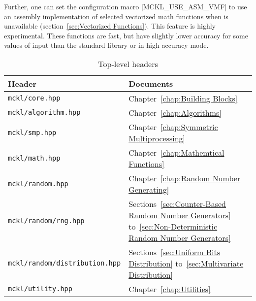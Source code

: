 Further, one can set the configuration macro |MCKL_USE_ASM_VMF| to use an
assembly implementation of selected vectorized math functions when \mkl \vml is
unavailable (section~\ref{sec:Vectorized Functions}). This feature is highly
experimental. These functions are fast, but have slightly lower accuracy for
some values of input than the standard library or \mkl \vml in high accuracy
mode.

\begin{table}[ht]
  \begin{tabularx}{\textwidth}{LL}
    \toprule
    Header & Documents \\
    \midrule
    \texttt{mckl/core.hpp}     & Chapter~\ref{chap:Building Blocks}          \\
    \texttt{mckl/algorithm.hpp}& Chapter~\ref{chap:Algorithms}               \\
    \texttt{mckl/smp.hpp}      & Chapter~\ref{chap:Symmetric Multiprocessing}\\
    \texttt{mckl/math.hpp}     & Chapter~\ref{chap:Mathemtical Functions}    \\
    \texttt{mckl/random.hpp}   & Chapter~\ref{chap:Random Number Generating} \\
    \texttt{mckl/random/rng.hpp}
    & Sections~\ref{sec:Counter-Based Random Number Generators}
    to~\ref{sec:Non-Deterministic Random Number Generators} \\
    \texttt{mckl/random/distribution.hpp}
    & Sections~\ref{sec:Uniform Bits Distribution}
    to~\ref{sec:Multivariate Distribution} \\
    \texttt{mckl/utility.hpp} & Chapter~\ref{chap:Utilities} \\
    \bottomrule
  \end{tabularx}
  \caption{Top-level headers}
  \label{tab:headers}
\end{table}
